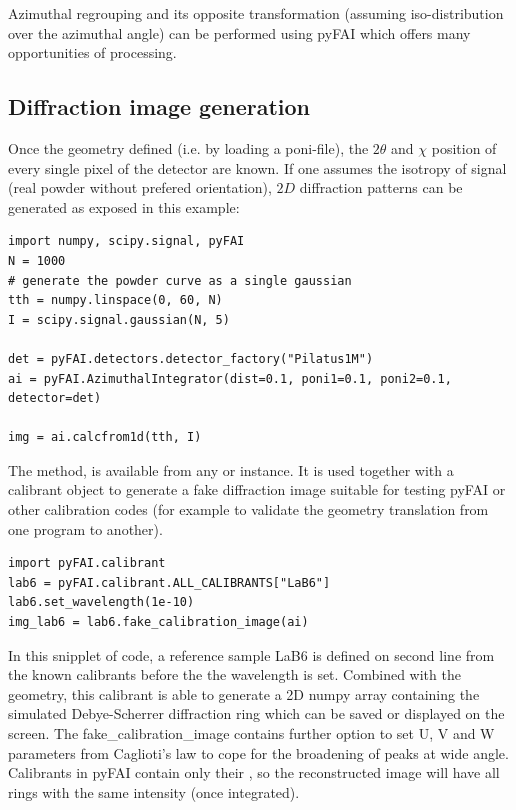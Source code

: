 \documentclass[preprint]{iucr}
\begin{document}
Azimuthal regrouping and its opposite transformation (assuming
iso-distribution over the azimuthal angle) can be performed
using pyFAI which offers many opportunities of processing.

\subsection{Diffraction image generation}

Once the geometry defined (i.e. by loading a poni-file), the $2\theta$ and
$\chi$ position of every single pixel of the detector are known.
If one assumes the isotropy of signal (real powder without prefered
orientation), $2D$ diffraction patterns can be generated as exposed in this
example:

\begin{verbatim}
import numpy, scipy.signal, pyFAI
N = 1000
# generate the powder curve as a single gaussian  
tth = numpy.linspace(0, 60, N)
I = scipy.signal.gaussian(N, 5)

det = pyFAI.detectors.detector_factory("Pilatus1M")
ai = pyFAI.AzimuthalIntegrator(dist=0.1, poni1=0.1, poni2=0.1, detector=det)

img = ai.calcfrom1d(tth, I)
\end{verbatim}


The method,  is available from any
 or  instance. 
It is used together with a calibrant object to generate a fake diffraction image
suitable for testing pyFAI or other calibration codes (for example to validate 
the geometry translation from one program to another).


\begin{verbatim}
import pyFAI.calibrant
lab6 = pyFAI.calibrant.ALL_CALIBRANTS["LaB6"]
lab6.set_wavelength(1e-10)
img_lab6 = lab6.fake_calibration_image(ai)
\end{verbatim}

In this snipplet of code, a reference sample LaB6 is defined on second line 
from the known calibrants before the the wavelength is set.
Combined with the geometry, this calibrant is able to 
generate a 2D numpy array containing the simulated Debye-Scherrer diffraction
ring which can be saved or displayed on the screen.
The fake_calibration_image contains further option to set U, V and W parameters
from Caglioti's law \cite{caglioti} to cope for the broadening of peaks at wide
angle. 
Calibrants in pyFAI contain only their , so the
reconstructed image will have all rings with the same
intensity (once integrated).
\end{document}
